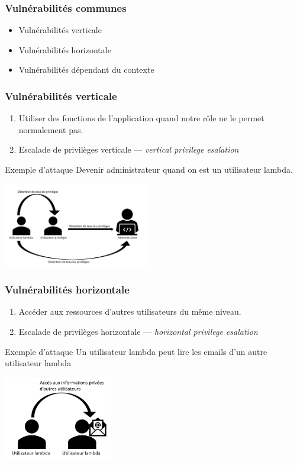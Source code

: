 \documentclass{beamer}
\begin{document}
\begin{frame}
  \frametitle{Vulnérabilités communes}
  \begin{itemize}
    \item Vulnérabilités verticale
    \item Vulnérabilités horizontale
    \item Vulnérabilités dépendant du contexte
  \end{itemize}
\end{frame}
\begin{frame}
  \frametitle{Vulnérabilités verticale}
  \begin{enumerate}
    \item[Vulnérabilité] Utiliser des fonctions de l'application quand notre rôle ne le permet normalement pas.
    \item[Type d'attaque] Escalade de privilèges verticale --- \emph{vertical privilege esalation}
  \end{enumerate}
  \begin{block}{Exemple d'attaque}
    Devenir administrateur quand on est un utilisateur lambda.
  \end{block}
  \begin{center}
    \includegraphics[height=10em]{escalade-vert}
  \end{center}
\end{frame}
\begin{frame}
  \frametitle{Vulnérabilités horizontale}
  \begin{enumerate}
    \item[Vulnérabilité] Accéder aux ressources d'autres utilisateurs du même niveau.
    \item[Type d'attaque] Escalade de privilèges horizontale --- \emph{horizontal privilege esalation}
  \end{enumerate}
  \begin{block}{Exemple d'attaque}
    Un utilisateur lambda peut lire les emails d'un autre utilisateur lambda
  \end{block}
  \begin{center}
    \includegraphics[height=10em]{escalade-hor}
  \end{center}
\end{frame}
\end{document}
